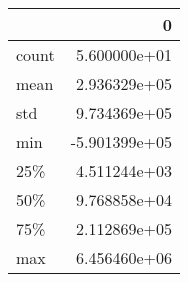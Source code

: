 \begin{tabular}{lr}
\toprule
{} &             0 \\
\midrule
count &  5.600000e+01 \\
mean  &  2.936329e+05 \\
std   &  9.734369e+05 \\
min   & -5.901399e+05 \\
25\%   &  4.511244e+03 \\
50\%   &  9.768858e+04 \\
75\%   &  2.112869e+05 \\
max   &  6.456460e+06 \\
\bottomrule
\end{tabular}
